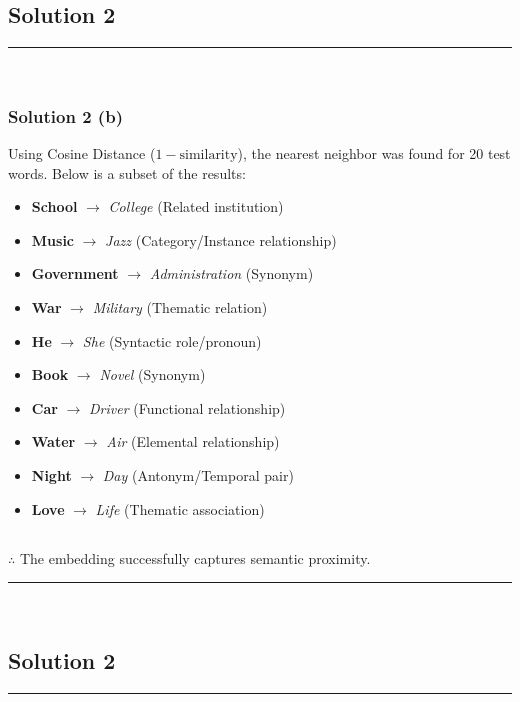 \documentclass{article}
\begin{document}
\subsection*{Solution 2}
\noindent\rule{\textwidth}{0.4pt}\\
\subsubsection*{Solution 2 (b)}

Using Cosine Distance ($1 - \text{similarity}$), the nearest neighbor was found for 20 test words.  Below is a subset of the results:

\begin{itemize}
    \item \textbf{School} $\to$ \textit{College} (Related institution)
    \item \textbf{Music} $\to$ \textit{Jazz} (Category/Instance relationship)
    \item \textbf{Government} $\to$ \textit{Administration} (Synonym)
    \item \textbf{War} $\to$ \textit{Military} (Thematic relation)
    \item \textbf{He} $\to$ \textit{She} (Syntactic role/pronoun)
    \item \textbf{Book} $\to$ \textit{Novel} (Synonym)
    \item \textbf{Car} $\to$ \textit{Driver} (Functional relationship)
    \item \textbf{Water} $\to$ \textit{Air} (Elemental relationship)
    \item \textbf{Night} $\to$ \textit{Day} (Antonym/Temporal pair)
    \item \textbf{Love} $\to$ \textit{Life} (Thematic association)
\end{itemize}

\subsection*{\normalfont}{$\therefore$ The embedding successfully captures semantic proximity.}

\noindent\rule{\textwidth}{0.4pt}\\
\newpage

\subsection*{Solution 2}
\noindent\rule{\textwidth}{0.4pt}\\
\end{document}
